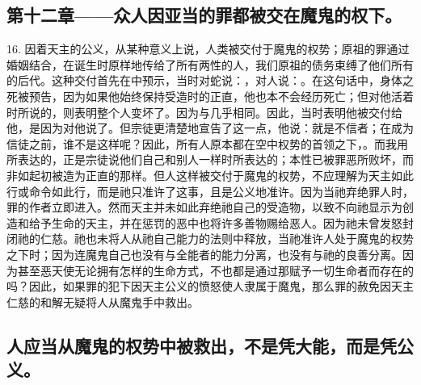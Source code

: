 
\subsection{第十二章——众人因亚当的罪都被交在魔鬼的权下。}

16. 因着天主的公义，从某种意义上说，人类被交付于魔鬼的权势；原祖的罪通过婚姻结合，在诞生时原样地传给了所有两性的人，我们原祖的债务束缚了他们所有的后代。这种交付首先在中预示，当时对蛇说：，对人说：。在这句话中，身体之死被预告，因为如果他始终保持受造时的正直，他也本不会经历死亡；但对他活着时所说的，则表明整个人变坏了。因为与几乎相同。因此，当时表明他被交付给他，是因为对他说了。但宗徒更清楚地宣告了这一点，他说：就是不信者；在成为信徒之前，谁不是这样呢？因此，所有人原本都在空中权势的首领之下，。而我用所表达的，正是宗徒说他们自己和别人一样时所表达的；本性已被罪恶所败坏，而非如起初被造为正直的那样。但人这样被交付于魔鬼的权势，不应理解为天主如此行或命令如此行，而是祂只准许了这事，且是公义地准许。因为当祂弃绝罪人时，罪的作者立即进入。然而天主并未如此弃绝祂自己的受造物，以致不向祂显示为创造和给予生命的天主，并在惩罚的恶中也将许多善物赐给恶人。因为祂未曾发怒封闭祂的仁慈。祂也未将人从祂自己能力的法则中释放，当祂准许人处于魔鬼的权势之下时；因为连魔鬼自己也没有与全能者的能力分离，也没有与祂的良善分离。因为甚至恶天使无论拥有怎样的生命方式，不也都是通过那赋予一切生命者而存在的吗？因此，如果罪的犯下因天主公义的愤怒使人隶属于魔鬼，那么罪的赦免因天主仁慈的和解无疑将人从魔鬼手中救出。\par


\subsection{人应当从魔鬼的权势中被救出，不是凭大能，而是凭公义。}

